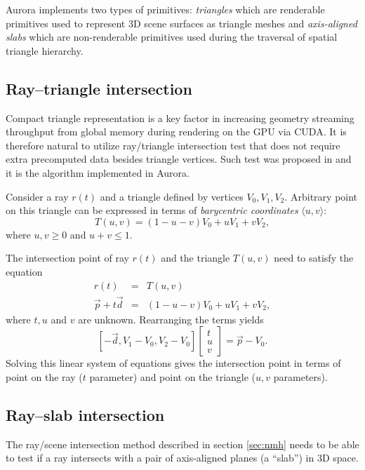 Aurora implements two types of primitives: \emph{triangles} which are renderable primitives used to represent 3D scene surfaces as triangle meshes and \emph{axis-aligned slabs} which are non-renderable primitives used during the traversal of spatial triangle hierarchy. 

\subsection{Ray--triangle intersection}
Compact triangle representation is a key factor in increasing geometry streaming throughput from global memory during rendering on the GPU via CUDA. It is therefore natural to utilize ray/triangle intersection test that does not require extra precomputed data besides triangle vertices. Such test was proposed in \cite{mt97} and it is the algorithm implemented in Aurora.

Consider a ray $r(t)$ and a triangle defined by vertices $V_{0}, V_{1}, V_{2}$. Arbitrary point on this triangle can be expressed in terms of \emph{barycentric coordinates} $\langle u, v \rangle$:
\begin{equation}
  T(u,v) = (1-u-v)V_{0} + uV_{1} + vV_{2},
\end{equation}
where $u, v \ge 0$ and $u+v \le 1$.

The intersection point of ray $r(t)$ and the triangle $T(u,v)$ need to satisfy the equation
\begin{eqnarray}
  r(t) &=& T(u,v) \nonumber \\
  \vec{p} + t\vec{d} &=& (1-u-v)V_{0} + uV_{1} + vV_{2},
\end{eqnarray}
where $t, u$ and $v$ are unknown. Rearranging the terms yields
\begin{equation}
\label{eq:int_triangle}
  \left\lbrack -\vec{d}, V_{1} - V_{0}, V_{2} - V_{0} \right\rbrack
  \left\lbrack 
    \begin{array}{c}
      t\\u\\v
    \end{array}
  \right\rbrack
  = \vec{p} - V_{0}.
\end{equation}
Solving this linear system of equations gives the intersection point in terms of point on the ray ($t$ parameter) and point on the triangle ($u,v$ parameters). 

\subsection{Ray--slab intersection}
The ray/scene intersection method described in section \ref{sec:nmh} needs to be able to test if a ray intersects with a pair of axis-aligned planes (a ``slab'') in 3D space.

